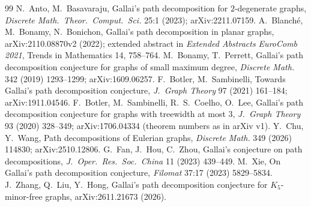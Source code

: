 \documentclass[11pt]{amsart}
\theoremstyle{definition}
\begin{document}
\begin{thebibliography}{99}
 N.~Anto, M.~Basavaraju, Gallai's path decomposition for $2$-degenerate graphs,
\emph{Discrete Math.\ Theor.\ Comput.\ Sci.} 25:1 (2023); arXiv:2211.07159.
 A.~Blanch\'e, M.~Bonamy, N.~Bonichon, Gallai's path decomposition in planar graphs,
arXiv:2110.08870v2 (2022); extended abstract in \emph{Extended Abstracts EuroComb 2021}, Trends in
Mathematics 14, 758--764.
 M.~Bonamy, T.~Perrett, Gallai's path decomposition conjecture for graphs of small maximum
degree, \emph{Discrete Math.} 342 (2019) 1293--1299; arXiv:1609.06257.
 F.~Botler, M.~Sambinelli, Towards Gallai's path decomposition conjecture, \emph{J.\ Graph
Theory} 97 (2021) 161--184; arXiv:1911.04546.
 F.~Botler, M.~Sambinelli, R.~S.~Coelho, O.~Lee, Gallai's path decomposition conjecture for
graphs with treewidth at most 3, \emph{J.\ Graph Theory} 93 (2020) 328--349; arXiv:1706.04334
(theorem numbers as in arXiv v1).
 Y.~Chu, Y.~Wang, Path decompositions of Eulerian graphs, \emph{Discrete Math.} 349 (2026)
114830; arXiv:2510.12806.
 G.~Fan, J.~Hou, C.~Zhou, Gallai's conjecture on path decompositions, \emph{J.\ Oper.\
Res.\ Soc.\ China} 11 (2023) 439--449.
 M.~Xie, On Gallai's path decomposition conjecture, \emph{Filomat} 37:17 (2023) 5829--5834.
\bibitem{ZLH} J.~Zhang, Q.~Liu, Y.~Hong, Gallai's path decomposition conjecture for $K_5$-minor-free
graphs, arXiv:2611.21673 (2026).
\end{thebibliography}
\end{document}
